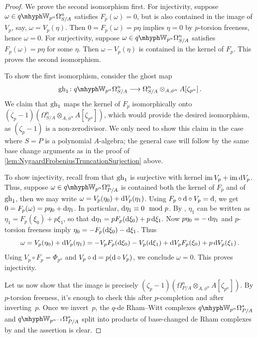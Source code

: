 \documentclass[DIV=12,numbers=enddot,leqno,bibliography=totoc]{scrartcl}
\begin{document}
	\begin{proof}
		We prove the second isomorphism first. For injectivity, suppose $\omega\in\qIW_{p^\alpha}\Omega_{S/A}^n$ satisfies $F_p(\omega)=0$, but is also contained in the image of $V_p$, say, $\omega=V_p(\eta)$. Then $0=F_p(\omega)=p\eta$ implies $\eta=0$ by $p$-torsion freeness, hence $\omega=0$. For surjectivity, suppose $\omega\in\qIW_{p^\alpha}\Omega_{S/A}^n$ satisfies $F_p(\omega)=p\eta$ for some $\eta$. Then $\omega-V_p(\eta)$ is contained in the kernel of $F_p$. This proves the second isomorphism.
		
		To show the first isomorphism, consider the ghost map
		\begin{equation*}
			\gh_1\colon \qIW_{p^\alpha}\Omega_{S/A}^n\longrightarrow \Omega_{S/A}^n\otimes_{A,\phi^\alpha}A[\zeta_{p^\alpha}]\,.
		\end{equation*}
		We claim that $\operatorname{gh}_1$ maps the kernel of $F_p$ isomorphically onto $(\zeta_p-1)(\Omega_{S/A}^n\otimes_{A,\phi^\alpha}A[\zeta_{p^\alpha}])$, which would provide the desired isomorphism, as $(\zeta_p-1)$ is a non-zerodivisor. We only need to show this claim in the case where $S=P$ is a polynomial $A$-algebra; the general case will follow by the same base change arguments as in the proof of \cref{lem:NygaardFrobeniusTruncationSurjection} above.
		
		To show injectivity, recall from \cite[Lemma~]{qWitt} that $\operatorname{gh}_1$ is surjective with kernel $\operatorname{im} V_p+\operatorname{im} \mathop{}\!\mathrm{d} V_p$. Thus, suppose $\omega\in\qIW_{p^\alpha}\Omega_{P/A}^n$ is contained both the kernel of $F_p$ and of $\operatorname{gh}_1$, then we may write $\omega=V_p(\eta_0)+\mathop{}\!\mathrm{d} V_p(\eta_1)$. Using $F_p\circ\mathop{}\!\mathrm{d}\circ V_p=\mathop{}\!\mathrm{d}$, we get  $0=F_p(\omega)=p\eta_0+\mathop{}\!\mathrm{d}\eta_1$. In particular, $\mathop{}\!\mathrm{d}\eta_1\equiv 0\mod p$. By \cite[({[$d_\alpha$]})]{qWitt}, $\eta_1$ can be written as $\eta_1=F_p(\xi_0)+p\xi_1$, so that $\mathop{}\!\mathrm{d}\eta_1=pF_p(\mathop{}\!\mathrm{d}\xi_0)+p\mathop{}\!\mathrm{d}\xi_1$. Now $p\eta_0=-\mathop{}\!\mathrm{d}\eta_1$ and $p$-torsion freeness imply $\eta_0=-F_p(\mathop{}\!\mathrm{d}\xi_0)-\mathop{}\!\mathrm{d}\xi_1$. Thus
		\begin{equation*}
			\omega=V_p(\eta_0)+\mathop{}\!\mathrm{d} V_p(\eta_1)=-V_pF_p(\mathop{}\!\mathrm{d}\xi_0)-V_p(\mathop{}\!\mathrm{d}\xi_1)+\mathop{}\!\mathrm{d} V_pF_p(\xi_0)+p\mathop{}\!\mathrm{d} V_p(\xi_1)\,.
		\end{equation*}
		Using $V_p\circ F_p=\Phi_{p^\alpha}$ and $V_p\circ \mathop{}\!\mathrm{d} = p(\mathop{}\!\mathrm{d}\circ V_p)$, we conclude $\omega=0$. This proves injectivity.
		
		Let us now show that the image is precisely $(\zeta_p-1)(\Omega_{P/A}^n\otimes_{A,\phi^\alpha}A[\zeta_{p^\alpha}])$. By $p$-torsion freeness, it's enough to check this after $p$-completion and after inverting~$p$. Once we invert~$p$, the $q$-de Rham--Witt complexes $\qIW_{p^\alpha}\Omega_{P/A}^*$ and $\qIW_{p^{\alpha-1}}\Omega_{P/A}^*$ split into products of base-changed de Rham complexes by \cite[Corollary~]{qWitt} and the assertion is clear.
		

\end{proof}
\end{document}
